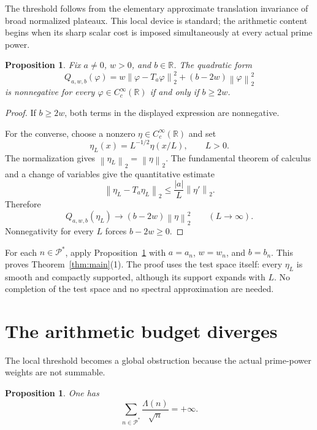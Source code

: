 \documentclass[11pt,a4paper]{amsart}
\newcommand{\R}{\mathbb{R}}
\newcommand{\PP}{\mathcal{P}^{\!*}}
\newcommand{\norm}[1]{\left\lVert #1\right\rVert_{2}}
\theoremstyle{plain}
\newtheorem{proposition}[theorem]{Proposition}
\theoremstyle{definition}
\begin{document}
The threshold follows from the elementary approximate translation invariance
of broad normalized plateaux.  This local device is standard; the arithmetic
content begins when its sharp scalar cost is imposed simultaneously at every
actual prime power.

\begin{proposition}\label{prop:local}
Fix $a\neq0$, $w>0$, and $b\in\R$.  The quadratic form
\[
 Q_{a,w,b}(\varphi)
 =w\norm{\varphi-T_a\varphi}^{2}+(b-2w)\norm{\varphi}^{2}
\]
is nonnegative for every $\varphi\in C_c^\infty(\R)$ if and only if
$b\geq2w$.
\end{proposition}

\begin{proof}
If $b\geq2w$, both terms in the displayed expression are nonnegative.

For the converse, choose a nonzero $\eta\in C_c^\infty(\R)$ and set
\[
 \eta_L(x)=L^{-1/2}\eta(x/L),\qquad L>0.
\]
The normalization gives $\norm{\eta_L}=\norm{\eta}$.  The fundamental theorem
of calculus and a change of variables give the quantitative estimate
\begin{equation}\label{eq:plateau-estimate}
 \norm{\eta_L-T_a\eta_L}
 \leq \frac{|a|}{L}\norm{\eta'}.
\end{equation}
Therefore
\[
 Q_{a,w,b}(\eta_L)
 \longrightarrow (b-2w)\norm{\eta}^{2}
 \qquad (L\to\infty).
\]
Nonnegativity for every $L$ forces $b-2w\geq0$.
\end{proof}

For each $n\in\PP$, apply Proposition~\ref{prop:local} with
$a=a_n$, $w=w_n$, and $b=b_n$.  This proves Theorem~\ref{thm:main}(1).
The proof uses the test space itself: every $\eta_L$ is smooth and compactly
supported, although its support expands with $L$.  No completion of the test
space and no spectral approximation are needed.

\section{The arithmetic budget diverges}

The local threshold becomes a global obstruction because the actual
prime-power weights are not summable.

\begin{proposition}\label{prop:weight-divergence}
One has
\[
 \sum_{n\in\PP}\frac{\Lambda(n)}{\sqrt n}=+\infty.
\]
\end{proposition}
\end{document}

